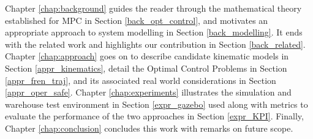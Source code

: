 \par Chapter \ref{chap:background} guides the reader through the mathematical theory established for \ac{MPC} in Section \ref{back_opt_control}, and motivates an appropriate approach to system modelling in Section \ref{back_modelling}. It ends with the related work and highlights our contribution in Section \ref{back_related}. Chapter \ref{chap:approach} goes on to describe candidate kinematic models in Section \ref{appr_kinematics}, detail the Optimal Control Problems in Section \ref{appr_fren_traj}, and its associated real world considerations in Section \ref{appr_oper_safe}. Chapter \ref{chap:experiments} illustrates the simulation and warehouse test environment in Section \ref{expr_gazebo} used along with metrics to evaluate the performance of the two approaches in Section \ref{expr_KPI}. Finally, Chapter \ref{chap:conclusion} concludes this work with remarks on future scope. 